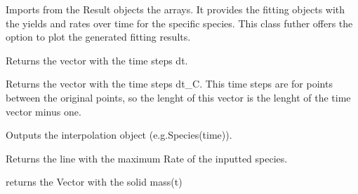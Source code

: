 \documentclass[letterpaper,10pt,english]{sphinxmanual}
\begin{document}
\begin{fulllineitems}
\label{FittingClasses:FitInfo.Fit_one_run}
Imports from the Result objects the arrays. It provides the fitting objects with the yields and rates over time for the specific species. This class futher offers the option to plot the generated fitting results.

\begin{fulllineitems}
\label{FittingClasses:FitInfo.Fit_one_run.Dt}
Returns the vector with the time steps dt.

\end{fulllineitems}


\begin{fulllineitems}
\label{FittingClasses:FitInfo.Fit_one_run.DtC}
Returns the vector with the time steps dt\_C. This time steps are for points between the original points, so the lenght of this vector is the lenght of the time vector minus one.

\end{fulllineitems}


\begin{fulllineitems}
\label{FittingClasses:FitInfo.Fit_one_run.Interpolate}
Outputs the interpolation object (e.g.Species(time)).

\end{fulllineitems}


\begin{fulllineitems}
\label{FittingClasses:FitInfo.Fit_one_run.LineNumberMaxRate}
Returns the line with the maximum Rate of the inputted species.

\end{fulllineitems}


\begin{fulllineitems}
\label{FittingClasses:FitInfo.Fit_one_run.MassCoal}
returns the Vector with the solid mass(t)


\end{fulllineitems}
\end{fulllineitems}
\end{document}
